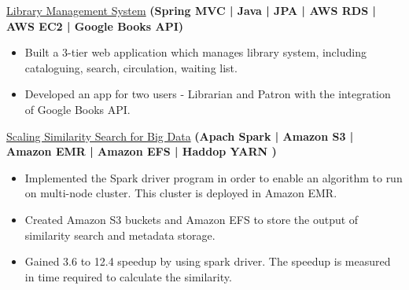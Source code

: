 \documentclass[10pt,a4paper]{article}
\begin{document}
{{{\headedsection  %
  {\href{https://github.com/darshilsaraiya/LibraryManagementSystem}{Library Management System}
  \textbf{
  \small{(Spring MVC | Java | JPA | AWS RDS | AWS EC2 | Google Books API)}}}
  {} {%
  
    {\bodytext
    {
    \begin{itemize}
        \item Built a 3-tier web application which manages library system, including cataloguing, search, circulation, waiting list.
        \item Developed an app for two users - Librarian and Patron with the integration of Google Books API.
        
    \end{itemize}}}
}

\headedsection  %
  {\href{https://github.com/darshilsaraiya/SparkScalaAllPairsSimilarity}{Scaling Similarity Search for Big Data}
  \textbf{
  \small{(Apach Spark | Amazon S3 | Amazon EMR | Amazon EFS | Haddop YARN )}}}
  {} {%
  
    {\bodytext
    {
    \begin{itemize}
        \item Implemented the Spark driver program in order to enable an algorithm to run on multi-node cluster. This cluster is deployed in Amazon EMR.
        \item Created Amazon S3 buckets and Amazon EFS to store the output of similarity search and metadata storage.
        \item Gained 3.6 to 12.4 speedup by using spark driver. The speedup is measured in time required to calculate the similarity.
        
    \end{itemize}}}
}


\spacedhrule{0.0em}{-0.4em}

}}}
\end{document}
